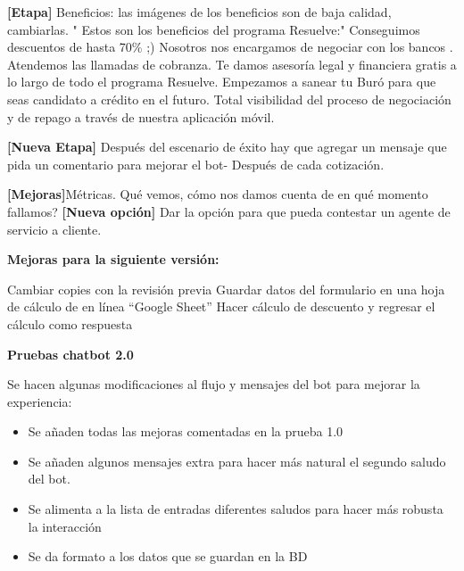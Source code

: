 \textbf{[Etapa]} Beneficios: las imágenes de los beneficios son de baja calidad, cambiarlas. " Estos son los beneficios del programa Resuelve:"
Conseguimos descuentos de hasta 70\% ;)
Nosotros nos encargamos de negociar con los bancos .
Atendemos las llamadas de cobranza.
Te damos asesoría legal y financiera gratis a lo largo de todo el programa Resuelve.
Empezamos a sanear tu Buró para que seas candidato a crédito en el futuro.
Total visibilidad del proceso de negociación y de repago a través de nuestra aplicación móvil.

\textbf{[Nueva Etapa]} Después del escenario de éxito hay que agregar un mensaje que pida un comentario para mejorar el bot- Después de cada cotización.

\textbf{[Mejoras]}Métricas. Qué vemos, cómo nos damos cuenta de en qué momento fallamos? 
\textbf{[Nueva opción]} Dar la opción para que pueda contestar un agente de servicio a cliente. 

\medskip
\textbf{Mejoras para la siguiente versión:}

Cambiar copies con la revisión previa
Guardar datos del formulario en una hoja de cálculo de en línea “Google Sheet”
Hacer cálculo de descuento y regresar el cálculo como respuesta

\medskip
\textbf{Pruebas chatbot 2.0}

Se hacen algunas modificaciones al flujo y mensajes del bot para mejorar la experiencia:
\begin{itemize}
\item Se añaden todas las mejoras comentadas en la prueba 1.0 
\item Se añaden algunos mensajes extra para hacer más natural el segundo saludo del bot.
\item Se alimenta a la lista de entradas diferentes saludos para hacer más robusta la interacción
\item Se da formato a los datos que se guardan en la BD

\end{itemize}

